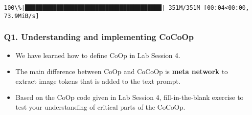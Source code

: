\documentclass[11pt]{article}
\begin{document}
    \begin{Verbatim}[commandchars=\\\{\}]
100\%|███████████████████████████████████████| 351M/351M [00:04<00:00, 73.9MiB/s]
    \end{Verbatim}

    \subsubsection*{\texorpdfstring{\textbf{Q1. Understanding and
implementing
CoCoOp}}{Q1. Understanding and implementing CoCoOp}}\label{q1.-understanding-and-implementing-cocoop}

\begin{itemize}
\item
  We have learned how to define CoOp in Lab Session 4.
\item
  The main difference between CoOp and CoCoOp is \textbf{meta network}
  to extract image tokens that is added to the text prompt.
\item
  Based on the CoOp code given in Lab Session 4, fill-in-the-blank
  exercise to test your understanding of critical parts of the CoCoOp.
\end{itemize}
\end{document}
